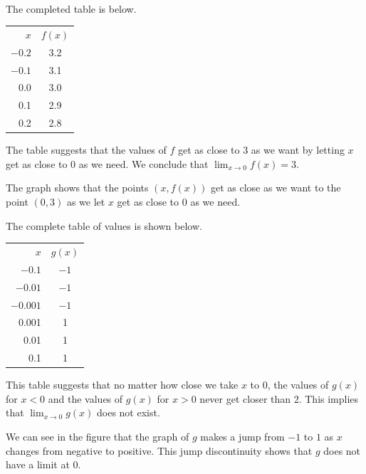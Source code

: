 \begin{activitySolution} ~
\ba
\item The completed table is below. 
  \begin{center}
    \begin{tabular}{|r|c|}
      \hline      
      $x$ & $f(x)$ \\
      \hhline{|=|=|}
      $-0.2$ & 3.2 \\
      \hline
      $-0.1$ & 3.1 \\
      \hline
      0.0 & 3.0 \\
      \hline
      0.1 & 2.9 \\
      \hline
      0.2 & 2.8 \\
      \hline
    \end{tabular}
  \end{center}
  The table suggests that the values of $f$ get as close to 3 as we want by letting $x$ get as close to 0 as we need. We conclude that 
$\lim_{x\to 0}f(x) = 3$.

\item The graph shows that the points $(x,f(x))$ get as close as we want to the point $(0,3)$ as we let $x$ get as close to 0 as we need. 
      
\item The complete table of values is shown below.
  \begin{center}
    \begin{tabular}{|r|c|}
      \hline      
      $x$ & $g(x)$ \\
      \hhline{|=|=|}
      $-0.1$ & $-1$ \\
      \hline 
      $-0.01$ & $-1$ \\
      \hline
      $-0.001$ & $-1$ \\
      \hline
      0.001 & 1 \\
      \hline
       0.01 & 1 \\
      \hline
      0.1 & 1 \\
      \hline
    \end{tabular}
  \end{center}
  This table suggests that no matter how close we take $x$ to 0, the values of $g(x)$ for $x < 0$ and the values of $g(x)$ for $x > 0$ never get closer than 2. This implies that $\lim_{x\to 0}g(x)$ does not exist. 

\item We can see in the figure that the graph of $g$ makes a jump from $-1$ to $1$ as $x$ changes from negative to positive. This jump discontinuity shows that $g$ does not have a limit at $0$. 
      

\end{activitySolution}
